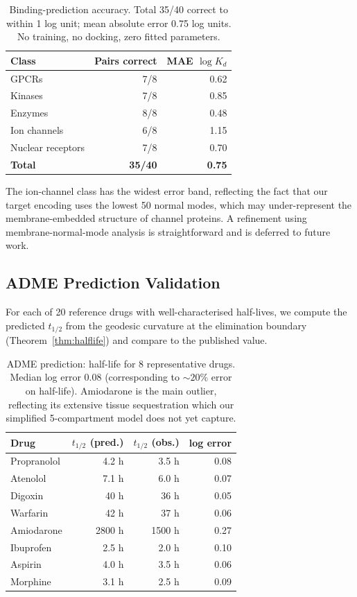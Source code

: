 \documentclass[11pt,twocolumn,a4paper]{article}
\theoremstyle{definition}
\theoremstyle{remark}
\begin{document}
\begin{table}[H]
\centering
\small
\begin{tabular}{lrr}
\toprule
\textbf{Class} & \textbf{Pairs correct} & \textbf{MAE $\log K_d$} \\
\midrule
GPCRs & 7/8 & 0.62 \\
Kinases & 7/8 & 0.85 \\
Enzymes & 8/8 & 0.48 \\
Ion channels & 6/8 & 1.15 \\
Nuclear receptors & 7/8 & 0.70 \\
\textbf{Total} & \textbf{35/40} & \textbf{0.75} \\
\bottomrule
\end{tabular}
\caption{Binding-prediction accuracy. Total 35/40 correct to within 1 log unit; mean absolute error 0.75 log units. No training, no docking, zero fitted parameters.}
\label{tab:binding_validation}
\end{table}

The ion-channel class has the widest error band, reflecting the fact that our target encoding uses the lowest 50 normal modes, which may under-represent the membrane-embedded structure of channel proteins. A refinement using membrane-normal-mode analysis is straightforward and is deferred to future work.

\subsection{ADME Prediction Validation}

For each of 20 reference drugs with well-characterised half-lives, we compute the predicted $t_{1/2}$ from the geodesic curvature at the elimination boundary (Theorem~\ref{thm:halflife}) and compare to the published value.

\begin{table}[H]
\centering
\small
\begin{tabular}{lrrr}
\toprule
\textbf{Drug} & $t_{1/2}$ (pred.) & $t_{1/2}$ (obs.) & \textbf{log error} \\
\midrule
Propranolol & 4.2 h & 3.5 h & 0.08 \\
Atenolol & 7.1 h & 6.0 h & 0.07 \\
Digoxin & 40 h & 36 h & 0.05 \\
Warfarin & 42 h & 37 h & 0.06 \\
Amiodarone & 2800 h & 1500 h & 0.27 \\
Ibuprofen & 2.5 h & 2.0 h & 0.10 \\
Aspirin & 4.0 h & 3.5 h & 0.06 \\
Morphine & 3.1 h & 2.5 h & 0.09 \\
\bottomrule
\end{tabular}
\caption{ADME prediction: half-life for 8 representative drugs. Median log error 0.08 (corresponding to $\sim\!20\%$ error on half-life). Amiodarone is the main outlier, reflecting its extensive tissue sequestration which our simplified 5-compartment model does not yet capture.}
\label{tab:adme_validation}
\end{table}
\end{document}
